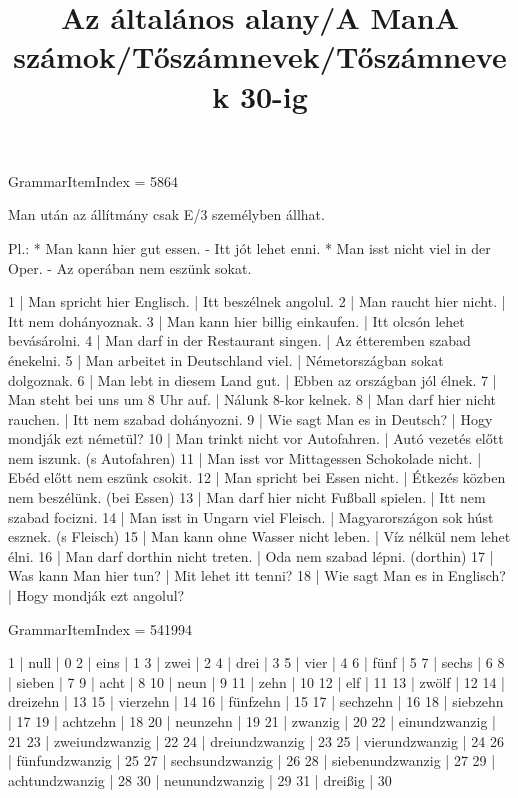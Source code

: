 \title{Az általános alany/A Man}

GrammarItemIndex = 5864

\begin{desc}
Man után az állítmány csak E/3 személyben állhat.

Pl.: * Man kann hier gut essen. - Itt jót lehet enni.
* Man isst nicht viel in der Oper. - Az operában nem eszünk sokat. 
\end{desc}

\begin{exmp}
1 | Man spricht hier Englisch. | Itt beszélnek angolul.
2 | Man raucht hier nicht. | Itt nem dohányoznak.
3 | Man kann hier billig einkaufen. | Itt olcsón lehet bevásárolni.
4 | Man darf in der Restaurant singen. | Az étteremben szabad énekelni.
5 | Man arbeitet in Deutschland viel. | Németországban sokat dolgoznak.
6 | Man lebt in diesem Land gut. | Ebben az országban jól élnek.
7 | Man steht bei uns um 8 Uhr auf. | Nálunk 8-kor kelnek.
8 | Man darf hier nicht rauchen. | Itt nem szabad dohányozni.
9 | Wie sagt Man es in Deutsch? | Hogy mondják ezt németül?
10 | Man trinkt nicht vor Autofahren. | Autó vezetés előtt nem iszunk. (s Autofahren)
11 | Man isst vor Mittagessen Schokolade nicht. | Ebéd előtt nem eszünk csokit.
12 | Man spricht bei Essen nicht. | Étkezés közben nem beszélünk. (bei Essen)
13 | Man darf hier nicht Fußball spielen. | Itt nem szabad focizni.
14 | Man isst in Ungarn viel Fleisch. | Magyarországon sok húst esznek. (s Fleisch)
15 | Man kann ohne Wasser nicht leben. | Víz nélkül nem lehet élni.
16 | Man darf dorthin nicht treten. | Oda nem szabad lépni. (dorthin)
17 | Was kann Man hier tun? | Mit lehet itt tenni?
18 | Wie sagt Man es in Englisch? | Hogy mondják ezt angolul?
\end{exmp}

\title{A számok/Tőszámnevek/Tőszámnevek 30-ig}

GrammarItemIndex = 541994

\begin{desc}
\end{desc}

\begin{exmp}
1 | null | 0
2 | eins | 1
3 | zwei | 2
4 | drei | 3
5 | vier | 4
6 | fünf | 5
7 | sechs | 6
8 | sieben | 7
9 | acht | 8
10 | neun | 9
11 | zehn | 10
12 | elf | 11
13 | zwölf | 12
14 | dreizehn | 13
15 | vierzehn | 14
16 | fünfzehn | 15
17 | sechzehn | 16
18 | siebzehn | 17
19 | achtzehn | 18
20 | neunzehn | 19
21 | zwanzig | 20
22 | einundzwanzig | 21
23 | zweiundzwanzig | 22
24 | dreiundzwanzig | 23
25 | vierundzwanzig | 24
26 | fünfundzwanzig | 25
27 | sechsundzwanzig | 26
28 | siebenundzwanzig | 27
29 | achtundzwanzig | 28
30 | neunundzwanzig | 29
31 | dreißig | 30
\end{exmp}

